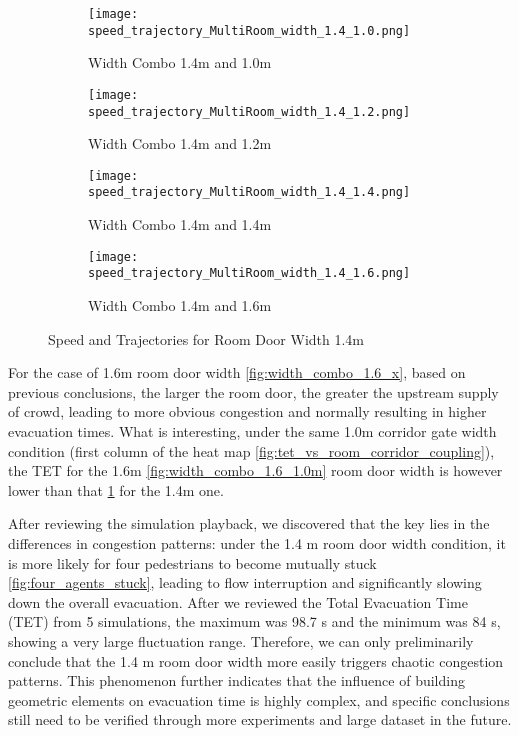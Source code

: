 \begin{figure}[h]
    \centering
        \begin{subfigure}[b]{.45\linewidth}
        \texttt{[image: 
            speed\_trajectory\_MultiRoom\_width\_1.4\_1.0.png]}
        \caption{Width Combo 1.4m and 1.0m}
        \label{fig:width_combo_1.4_1.0m}
    \end{subfigure}
    \begin{subfigure}[b]{.45\linewidth}
        \texttt{[image: 
            speed\_trajectory\_MultiRoom\_width\_1.4\_1.2.png]}
        \caption{Width Combo 1.4m and 1.2m}
        \label{fig:width_combo_1.4_1.2m}
    \end{subfigure}

    \begin{subfigure}[b]{.45\linewidth}
        \texttt{[image: 
            speed\_trajectory\_MultiRoom\_width\_1.4\_1.4.png]}
        \caption{Width Combo 1.4m and 1.4m}
        \label{fig:width_combo_1.4_1.4m}
    \end{subfigure}
    \begin{subfigure}[b]{.45\linewidth}
        \texttt{[image: 
            speed\_trajectory\_MultiRoom\_width\_1.4\_1.6.png]}
        \caption{Width Combo 1.4m and 1.6m}
        \label{fig:width_combo_1.4_1.6m}
    \end{subfigure}
    
    \caption{Speed and Trajectories for Room Door Width 1.4m}
    \label{fig:width_combo_1.4_x}
\end{figure}

For the case of 1.6m room door width \ref{fig:width_combo_1.6_x}, based on previous conclusions, the larger the room door, the greater the upstream supply of crowd, leading to more obvious congestion and normally resulting in higher evacuation times. What is interesting, under the same 1.0m corridor gate width condition (first column of the heat map \ref{fig:tet_vs_room_corridor_coupling}), the TET for the 1.6m \ref{fig:width_combo_1.6_1.0m} room door width is however lower than that \ref{fig:width_combo_1.4_1.0m} for the 1.4m one.

After reviewing the simulation playback, we discovered that the key lies in the differences in congestion patterns: under the 1.4 m room door width condition, it is more likely for four pedestrians to become mutually stuck \ref{fig:four_agents_stuck}, leading to flow interruption and significantly slowing down the overall evacuation. After we reviewed the Total Evacuation Time (TET) from 5 simulations, the maximum was 98.7 s and the minimum was 84 s, showing a very large fluctuation range. Therefore, we can only preliminarily conclude that the 1.4 m room door width more easily triggers chaotic congestion patterns. This phenomenon further indicates that the influence of building geometric elements on evacuation time is highly complex, and specific conclusions still need to be verified through more experiments and large dataset in the future.

